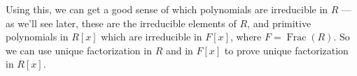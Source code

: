 Using this, we can get a good sense of which polynomials are irreducible in $R$ --- as we'll see later, these are the irreducible elements of $R$, and primitive polynomials in $R[x]$ which are irreducible in $F[x]$, where $F = \operatorname{Frac}(R)$. So we can use unique factorization in $R$ and in $F[x]$ to prove unique factorization in $R[x]$. 

 
 

